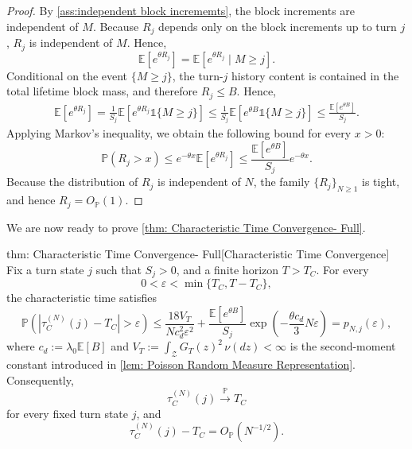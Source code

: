 \documentclass{article}
\theoremstyle{definition}
\newcommand{\E}{\mathbb E}
\newcommand{\pro}{\mathbb P}
\newcommand{\one}{\mathds{1}}
\begin{document}
\begin{proof}

    By \cref{ass:independent block incrememts}, the block increments are independent of $M$. Because $R_j$ depends only on the block increments up to turn $j$, $R_j$ is independent of $M$. Hence,
    \begin{equation*}
        \E[e^{\theta R_j}]=\E[e^{\theta R_j}\mid M\geq j].
    \end{equation*}
    Conditional on the event $\{M\geq j\}$, the turn-$j$ history content is contained in the total lifetime block mass, and therefore $R_j\leq B$. Hence,
    \begin{align*}
        \E[e^{\theta R_j}]
        =\frac{1}{S_j}\E\left[e^{\theta R_j}\one\{M\geq j\}\right] 
        \leq\frac{1}{S_j}\E\left[e^{\theta B}\one\{M\geq j\}\right] \leq\frac{\E[e^{\theta B}]}{S_j}.
    \end{align*}
    Applying Markov's inequality, we obtain the following bound for every $x>0$:
    \begin{equation*}
        \pro(R_j>x)\leq e^{-\theta x}\E[e^{\theta R_j}]\leq\frac{\E[e^{\theta B}]}{S_j}e^{-\theta x}.
    \end{equation*}
     Because the distribution of $R_j$ is independent of $N$, the family $\{R_j\}_{N\geq1}$ is tight, and hence $R_j=O_{\mathbb P}(1)$.
\end{proof}


We are now ready to prove \cref{thm: Characteristic Time Convergence- Full}.

\begin{reptheorem}{thm: Characteristic Time Convergence- Full}[Characteristic Time Convergence]
    Fix a turn state $j$ such that $S_j>0$, and a finite horizon $T>T_C$. For every
    \begin{equation*}
        0<\varepsilon<\min\{T_C,T-T_C\},
    \end{equation*}
    the characteristic time satisfies
    \begin{equation*}
        \pro\left(\left|\tau_C^{(N)}(j)-T_C\right|>\varepsilon\right)
        \leq\frac{18V_T}{Nc_d^2\varepsilon^2}
        +\frac{\E[e^{\theta B}]}{S_j}\exp\left(-\frac{\theta c_d}{3}N\varepsilon\right) = p_{N,j}(\varepsilon),
    \end{equation*}
    where $c_d:=\lambda_0\E[B]$ and $V_T:=\int_{\mathcal Z}G_T(z)^2\,\nu(dz)<\infty$ is the second-moment constant introduced in \cref{lem: Poisson Random Measure Representation}. Consequently,
    \begin{equation*}
        \tau_C^{(N)}(j)\xrightarrow{\mathbb P}T_C
    \end{equation*}
    for every fixed turn state $j$, and
    \begin{equation}
    \label{equ: characteristic time convergence rate-2}
        \tau_C^{(N)}(j)-T_C=O_{\mathbb P}(N^{-1/2}).
    \end{equation}
\end{reptheorem}
\end{document}
